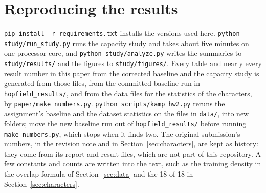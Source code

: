 \section*{Reproducing the results}

\texttt{pip install -r requirements.txt} installs the versions used here. \texttt{python study/run\_study.py} runs the capacity study and takes about five minutes on one processor core, and \texttt{python study/analyze.py} writes the summaries to \texttt{study/results/} and the figures to \texttt{study/figures/}. Every table and nearly every result number in this paper from the corrected baseline and the capacity study is generated from those files, from the committed baseline run in \texttt{hopfield\_results/}, and from the data files for the statistics of the characters, by \texttt{paper/make\_numbers.py}. \texttt{python scripts/kamp\_hw2.py} reruns the assignment's baseline and the dataset statistics on the files in \texttt{data/}, into new folders; move the new baseline run out of \texttt{hopfield\_results/} before running \texttt{make\_numbers.py}, which stops when it finds two. The original submission's numbers, in the revision note and in Section~\ref{sec:characters}, are kept as history: they come from its report and result files, which are not part of this repository. A few constants and counts are written into the text, such as the training density in the overlap formula of Section~\ref{sec:data} and the 18 of 18 in Section~\ref{sec:characters}.
